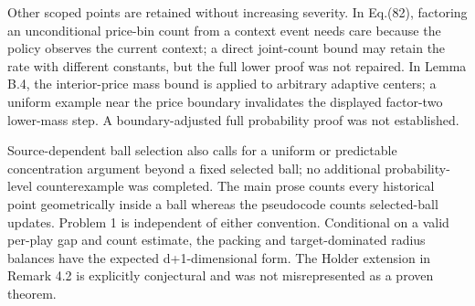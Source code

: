 \documentclass[10pt]{article}
\begin{document}
Other scoped points are retained without increasing severity. In Eq.(82), factoring an unconditional price-bin count from a context event needs care because the policy observes the current context; a direct joint-count bound may retain the rate with different constants, but the full lower proof was not repaired. In Lemma B.4, the interior-price mass bound is applied to arbitrary adaptive centers; a uniform example near the price boundary invalidates the displayed factor-two lower-mass step. A boundary-adjusted full probability proof was not established.\par
Source-dependent ball selection also calls for a uniform or predictable concentration argument beyond a fixed selected ball; no additional probability-level counterexample was completed. The main prose counts every historical point geometrically inside a ball whereas the pseudocode counts selected-ball updates. Problem 1 is independent of either convention. Conditional on a valid per-play gap and count estimate, the packing and target-dominated radius balances have the expected d+1-dimensional form. The Holder extension in Remark 4.2 is explicitly conjectural and was not misrepresented as a proven theorem.\par
\end{document}
